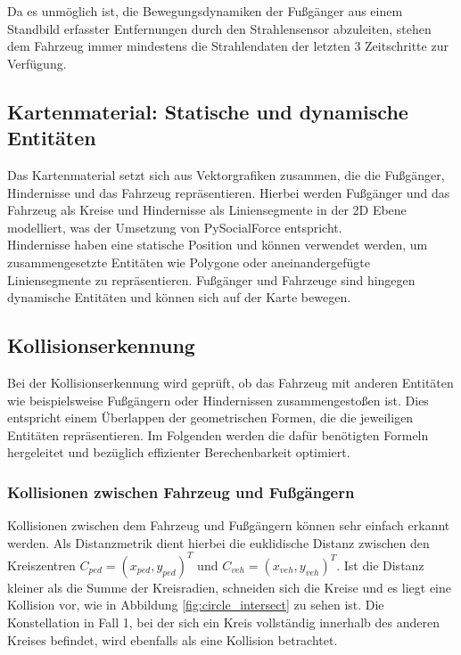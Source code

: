 Da es unmöglich ist, die Bewegungsdynamiken der Fußgänger aus einem Standbild
erfasster Entfernungen durch den Strahlensensor abzuleiten, stehen dem Fahrzeug
immer mindestens die Strahlendaten der letzten 3 Zeitschritte zur Verfügung.

\subsection{Kartenmaterial: Statische und dynamische Entitäten}
Das Kartenmaterial setzt sich aus Vektorgrafiken zusammen, die die Fußgänger,
Hindernisse und das Fahrzeug repräsentieren. Hierbei werden Fußgänger und das
Fahrzeug als Kreise und Hindernisse als Liniensegmente in der 2D Ebene modelliert,
was der Umsetzung von PySocialForce entspricht.\\

Hindernisse haben eine statische Position und können verwendet werden,
um zusammengesetzte Entitäten wie Polygone oder aneinandergefügte Liniensegmente
zu repräsentieren. Fußgänger und Fahrzeuge sind hingegen dynamische Entitäten
und können sich auf der Karte bewegen.

\subsection{Kollisionserkennung}
Bei der Kollisionserkennung wird geprüft, ob das Fahrzeug mit anderen Entitäten
wie beispielsweise Fußgängern oder Hindernissen zusammengestoßen ist.
Dies entspricht einem Überlappen der geometrischen Formen, die die jeweiligen
Entitäten repräsentieren. Im Folgenden werden die dafür benötigten Formeln
hergeleitet und bezüglich effizienter Berechenbarkeit optimiert.

\subsubsection{Kollisionen zwischen Fahrzeug und Fußgängern}
Kollisionen zwischen dem Fahrzeug und Fußgängern können sehr einfach erkannt werden.
Als Distanzmetrik dient hierbei die euklidische Distanz zwischen den Kreiszentren
$C_{ped} = (x_{ped}, y_{ped})^T$ und $C_{veh} = (x_{veh}, y_{veh})^T$.
Ist die Distanz kleiner als die Summe der Kreisradien, schneiden sich die Kreise
und es liegt eine Kollision vor, wie in Abbildung \ref{fig:circle_intersect}
zu sehen ist. Die Konstellation in Fall 1, bei der sich ein Kreis vollständig innerhalb
des anderen Kreises befindet, wird ebenfalls als eine Kollision betrachtet.\\

